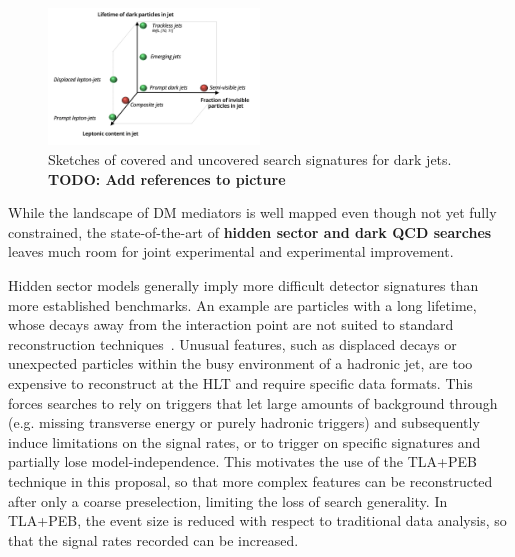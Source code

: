\begin{figure} 
\begin{center}
\includegraphics[width=0.5\textwidth]{figs_B2/DarkSectorSketch}
\caption{Sketches of covered and uncovered search signatures for dark jets. \color{red}\textbf{TODO: Add references to picture}\color{black}
\label{fig:darksectorssketch} }
\vskip-10pt
\end{center}
\end{figure}
 
While the landscape of DM mediators is well mapped even though not yet fully constrained, 
the state-of-the-art of \textbf{hidden sector and dark QCD searches} leaves much room for joint experimental and experimental improvement.

Hidden sector models generally imply more difficult detector signatures than more established benchmarks. 
An example are particles with a long lifetime, whose decays away from the interaction point are not suited to standard reconstruction techniques~\cite{ToBeCited}.
Unusual features, such as displaced decays or unexpected particles within the busy environment of a hadronic jet, are too expensive to reconstruct at the HLT and require specific data formats. %
This forces searches to rely on triggers that let large amounts of background through (e.g. missing transverse energy or purely hadronic triggers) and subsequently induce limitations on the signal rates, or to trigger on specific signatures and partially lose model-independence. 
This motivates the use of the TLA+PEB technique in this proposal, so that more complex features can be reconstructed after only a coarse preselection, limiting the loss of search generality. In TLA+PEB, the event size is reduced with respect to traditional data analysis, so that the signal rates recorded can be increased. 

